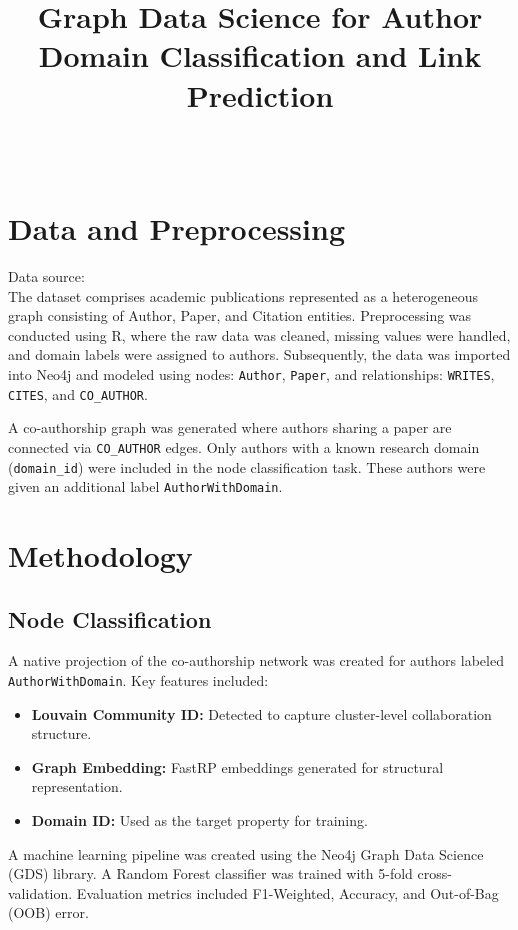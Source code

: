 \documentclass[conference]{IEEEtran}
\title{Graph Data Science for Author Domain Classification and Link Prediction}
\author{\IEEEauthorblockN{Basil Ali Khan, Hamza Ansari, Hayyan Khan} \\
\IEEEauthorblockA{Group 6\\ Graph Data Science, Spring 2025}}
\begin{document}
\maketitle



\section{Data and Preprocessing}
Data source: \cite{10.1162/qss_a_00163}\\
The dataset comprises academic publications represented as a heterogeneous graph consisting of Author, Paper, and Citation entities. Preprocessing was conducted using R, where the raw data was cleaned, missing values were handled, and domain labels were assigned to authors. Subsequently, the data was imported into Neo4j and modeled using nodes: \texttt{Author}, \texttt{Paper}, and relationships: \texttt{WRITES}, \texttt{CITES}, and \texttt{CO\_AUTHOR}. 

A co-authorship graph was generated where authors sharing a paper are connected via \texttt{CO\_AUTHOR} edges. Only authors with a known research domain (\texttt{domain\_id}) were included in the node classification task. These authors were given an additional label \texttt{AuthorWithDomain}.

\section{Methodology}

\subsection{Node Classification}
A native projection of the co-authorship network was created for authors labeled \texttt{AuthorWithDomain}. Key features included:
\begin{itemize}
  \item \textbf{Louvain Community ID:} Detected to capture cluster-level collaboration structure.
  \item \textbf{Graph Embedding:} FastRP embeddings generated for structural representation.
  \item \textbf{Domain ID:} Used as the target property for training.
\end{itemize}

A machine learning pipeline was created using the Neo4j Graph Data Science (GDS) library. A Random Forest classifier was trained with 5-fold cross-validation. Evaluation metrics included F1-Weighted, Accuracy, and Out-of-Bag (OOB) error.
\end{document}
